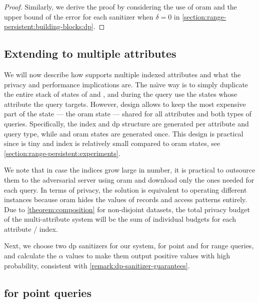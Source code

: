 		\begin{proof}
			Similarly, we derive the proof by considering the use of \acrshort{oram} and the upper bound of the error for each sanitizer when $\delta = 0$ in \cref{section:range-persistent:building-blocks:dp}.
		\end{proof}

	\subsection{Extending to multiple attributes}\label{section:range-persistent:dp-oram:multiple-attributes}

		We will now describe how \epsolute{} supports multiple indexed attributes and what the privacy and performance implications are.
		The na\"{\i}ve way is to simply duplicate the entire stack of states of \user{} and \server{}, and during the query use the states whose attribute the query targets.
		However, \epsolute{} design allows to keep the most expensive part of the state --- the \acrshort{oram} state --- shared for all attributes and both types of queries.
		Specifically, the index \indexI{} and \acrshort{dp} structure \serverDS{} are generated per attribute and query type, while \user{} and \server{} \acrshort{oram} states are generated once.
		This design is practical since \serverDS{} is tiny and index \indexI{} is relatively small compared to \acrshort{oram} states, see \cref{section:range-persistent:experiments}.

		We note that in case the indices grow large in number, it is practical to outsource them to the adversarial server using \acrshort{oram} and download only the ones needed for each query.
		In terms of privacy, the solution is equivalent to operating different \epsolute{} instances because \acrshort{oram} hides the values of records and access patterns entirely.
		Due to \cref{theorem:composition} for non-disjoint datasets, the total privacy budget of the multi-attribute system will be the sum of individual budgets for each attribute / index.

		Next, we choose two \acrshort{dp} sanitizers for our system, for point and for range queries, and calculate the $\alpha$ values to make them output positive values with high probability, consistent with \cref{remark:dp-sanitizer-guarantees}.

	\subsection{\texorpdfstring{\epsolute{}}{Epsolute} for point queries}\label{section:range-persistent:dp-oram:point}

